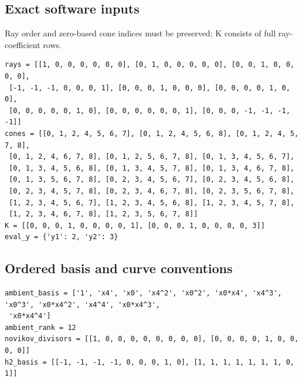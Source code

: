 \documentclass[10pt,a4paper]{article}
\begin{document}
\subsection*{Exact software inputs}
Ray order and zero-based cone indices must be preserved; K consists of full ray-coefficient rows.
\begin{lstlisting}
rays = [[1, 0, 0, 0, 0, 0, 0], [0, 1, 0, 0, 0, 0, 0], [0, 0, 1, 0, 0, 0, 0],
 [-1, -1, -1, 0, 0, 0, 1], [0, 0, 0, 1, 0, 0, 0], [0, 0, 0, 0, 1, 0, 0],
 [0, 0, 0, 0, 0, 1, 0], [0, 0, 0, 0, 0, 0, 1], [0, 0, 0, -1, -1, -1, -1]]
cones = [[0, 1, 2, 4, 5, 6, 7], [0, 1, 2, 4, 5, 6, 8], [0, 1, 2, 4, 5, 7, 8],
 [0, 1, 2, 4, 6, 7, 8], [0, 1, 2, 5, 6, 7, 8], [0, 1, 3, 4, 5, 6, 7],
 [0, 1, 3, 4, 5, 6, 8], [0, 1, 3, 4, 5, 7, 8], [0, 1, 3, 4, 6, 7, 8],
 [0, 1, 3, 5, 6, 7, 8], [0, 2, 3, 4, 5, 6, 7], [0, 2, 3, 4, 5, 6, 8],
 [0, 2, 3, 4, 5, 7, 8], [0, 2, 3, 4, 6, 7, 8], [0, 2, 3, 5, 6, 7, 8],
 [1, 2, 3, 4, 5, 6, 7], [1, 2, 3, 4, 5, 6, 8], [1, 2, 3, 4, 5, 7, 8],
 [1, 2, 3, 4, 6, 7, 8], [1, 2, 3, 5, 6, 7, 8]]
K = [[0, 0, 0, 1, 0, 0, 0, 0, 1], [0, 0, 0, 1, 0, 0, 0, 0, 3]]
eval_y = {'y1': 2, 'y2': 3}
\end{lstlisting}
\subsection*{Ordered basis and curve conventions}
\begin{lstlisting}
ambient_basis = ['1', 'x4', 'x0', 'x4^2', 'x0^2', 'x0*x4', 'x4^3', 'x0^3', 'x0*x4^2', 'x4^4', 'x0*x4^3',
 'x0*x4^4']
ambient_rank = 12
novikov_divisors = [[1, 0, 0, 0, 0, 0, 0, 0, 0], [0, 0, 0, 0, 1, 0, 0, 0, 0]]
h2_basis = [[-1, -1, -1, -1, 0, 0, 0, 1, 0], [1, 1, 1, 1, 1, 1, 1, 0, 1]]
\end{lstlisting}
\end{document}
